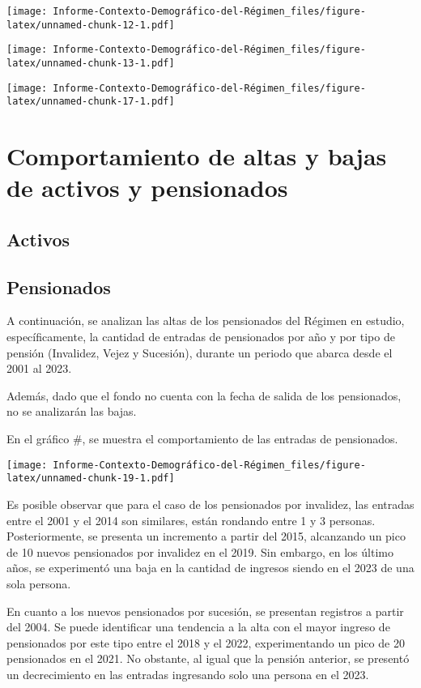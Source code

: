 \documentclass[
]{article}
\begin{document}
\texttt{[image: Informe-Contexto-Demográfico-del-Régimen\_files/figure-latex/unnamed-chunk-12-1.pdf]}

\texttt{[image: Informe-Contexto-Demográfico-del-Régimen\_files/figure-latex/unnamed-chunk-13-1.pdf]}

\texttt{[image: Informe-Contexto-Demográfico-del-Régimen\_files/figure-latex/unnamed-chunk-17-1.pdf]}

\hypertarget{comportamiento-de-altas-y-bajas-de-activos-y-pensionados}{%
\section{Comportamiento de altas y bajas de activos y
pensionados}\label{comportamiento-de-altas-y-bajas-de-activos-y-pensionados}}

\hypertarget{activos-1}{%
\subsection{Activos}\label{activos-1}}

\hypertarget{pensionados}{%
\subsection{Pensionados}\label{pensionados}}

A continuación, se analizan las altas de los pensionados del Régimen en
estudio, específicamente, la cantidad de entradas de pensionados por año
y por tipo de pensión (Invalidez, Vejez y Sucesión), durante un periodo
que abarca desde el 2001 al 2023.

Además, dado que el fondo no cuenta con la fecha de salida de los
pensionados, no se analizarán las bajas.

En el gráfico \#, se muestra el comportamiento de las entradas de
pensionados.

\texttt{[image: Informe-Contexto-Demográfico-del-Régimen\_files/figure-latex/unnamed-chunk-19-1.pdf]}

Es posible observar que para el caso de los pensionados por invalidez,
las entradas entre el 2001 y el 2014 son similares, están rondando entre
1 y 3 personas. Posteriormente, se presenta un incremento a partir del
2015, alcanzando un pico de 10 nuevos pensionados por invalidez en el
2019. Sin embargo, en los último años, se experimentó una baja en la
cantidad de ingresos siendo en el 2023 de una sola persona.

En cuanto a los nuevos pensionados por sucesión, se presentan registros
a partir del 2004. Se puede identificar una tendencia a la alta con el
mayor ingreso de pensionados por este tipo entre el 2018 y el 2022,
experimentando un pico de 20 pensionados en el 2021. No obstante, al
igual que la pensión anterior, se presentó un decrecimiento en las
entradas ingresando solo una persona en el 2023.
\end{document}
